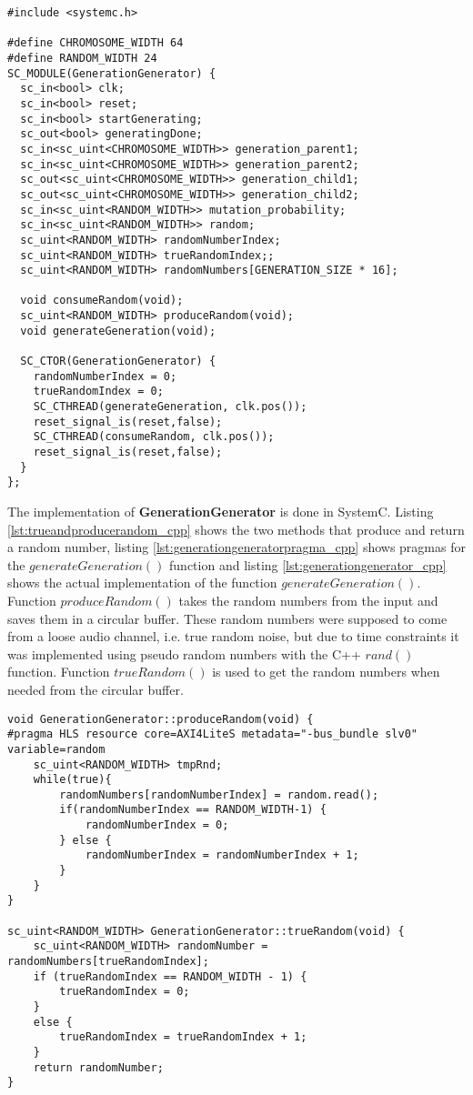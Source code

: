 \begin{lstlisting}[style=customc++, caption={GenerationGenerator.h},label={lst:generationgenerator_h}]
#include <systemc.h>

#define CHROMOSOME_WIDTH 64
#define RANDOM_WIDTH 24
SC_MODULE(GenerationGenerator) {
  sc_in<bool> clk;
  sc_in<bool> reset;
  sc_in<bool> startGenerating;
  sc_out<bool> generatingDone;
  sc_in<sc_uint<CHROMOSOME_WIDTH>> generation_parent1;
  sc_in<sc_uint<CHROMOSOME_WIDTH>> generation_parent2;
  sc_out<sc_uint<CHROMOSOME_WIDTH>> generation_child1;
  sc_out<sc_uint<CHROMOSOME_WIDTH>> generation_child2;
  sc_in<sc_uint<RANDOM_WIDTH>> mutation_probability;
  sc_in<sc_uint<RANDOM_WIDTH>> random;
  sc_uint<RANDOM_WIDTH> randomNumberIndex;
  sc_uint<RANDOM_WIDTH> trueRandomIndex;;
  sc_uint<RANDOM_WIDTH> randomNumbers[GENERATION_SIZE * 16];

  void consumeRandom(void);
  sc_uint<RANDOM_WIDTH> produceRandom(void);
  void generateGeneration(void);
  
  SC_CTOR(GenerationGenerator) {
    randomNumberIndex = 0;
    trueRandomIndex = 0;
    SC_CTHREAD(generateGeneration, clk.pos());
    reset_signal_is(reset,false);
    SC_CTHREAD(consumeRandom, clk.pos());
    reset_signal_is(reset,false);
  }
};
\end{lstlisting}

The implementation of \textbf{GenerationGenerator} is done in SystemC. Listing \ref{lst:trueandproducerandom_cpp} shows the two methods that produce and return a random number, listing \ref{lst:generationgeneratorpragma_cpp} shows pragmas for the $generateGeneration()$ function and listing \ref{lst:generationgenerator_cpp} shows the actual implementation of the function $generateGeneration()$. Function $produceRandom()$ takes the random numbers from the input and saves them in a circular buffer. These random numbers were supposed to come from a loose audio channel, i.e. true random noise, but due to time constraints it was implemented using pseudo random numbers with the C++ $rand()$ function. Function $trueRandom()$ is used to get the random numbers when needed from the circular buffer.

\begin{lstlisting}[style=customc++,caption=The two methods for producing and accessing a random number.]
void GenerationGenerator::produceRandom(void) {
#pragma HLS resource core=AXI4LiteS metadata="-bus_bundle slv0" variable=random
	sc_uint<RANDOM_WIDTH> tmpRnd;
	while(true){
		randomNumbers[randomNumberIndex] = random.read();
		if(randomNumberIndex == RANDOM_WIDTH-1) {
			randomNumberIndex = 0;
		} else {
			randomNumberIndex = randomNumberIndex + 1;
		}
	}
}

sc_uint<RANDOM_WIDTH> GenerationGenerator::trueRandom(void) {
	sc_uint<RANDOM_WIDTH> randomNumber = randomNumbers[trueRandomIndex];
	if (trueRandomIndex == RANDOM_WIDTH - 1) {
		trueRandomIndex = 0;
	}
	else {
		trueRandomIndex = trueRandomIndex + 1;
	}
	return randomNumber;
}
\end{lstlisting}  

